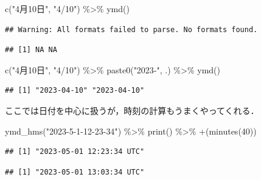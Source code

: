 \documentclass[
]{article}
\newenvironment{Shaded}{\begin{snugshade}}{\end{snugshade}}
\newcommand{\AttributeTok}[1]{\textcolor[rgb]{0.77,0.63,0.00}{#1}}
\newcommand{\DecValTok}[1]{\textcolor[rgb]{0.00,0.00,0.81}{#1}}
\newcommand{\FunctionTok}[1]{\textcolor[rgb]{0.00,0.00,0.00}{#1}}
\newcommand{\NormalTok}[1]{#1}
\newcommand{\SpecialCharTok}[1]{\textcolor[rgb]{0.00,0.00,0.00}{#1}}
\newcommand{\StringTok}[1]{\textcolor[rgb]{0.31,0.60,0.02}{#1}}
\begin{document}
\begin{Shaded}
\begin{Highlighting}[]
\FunctionTok{c}\NormalTok{(}\StringTok{"4月10日"}\NormalTok{, }\StringTok{"4/10"}\NormalTok{) }\SpecialCharTok{\%\textgreater{}\%}
  \FunctionTok{ymd}\NormalTok{()}
\end{Highlighting}
\end{Shaded}

\begin{verbatim}
## Warning: All formats failed to parse. No formats found.
\end{verbatim}

\begin{verbatim}
## [1] NA NA
\end{verbatim}

\begin{Shaded}
\begin{Highlighting}[]
\FunctionTok{c}\NormalTok{(}\StringTok{"4月10日"}\NormalTok{, }\StringTok{"4/10"}\NormalTok{) }\SpecialCharTok{\%\textgreater{}\%}
  \FunctionTok{paste0}\NormalTok{(}\StringTok{"2023{-}"}\NormalTok{, .) }\SpecialCharTok{\%\textgreater{}\%}
  \FunctionTok{ymd}\NormalTok{()}
\end{Highlighting}
\end{Shaded}

\begin{verbatim}
## [1] "2023-04-10" "2023-04-10"
\end{verbatim}

ここでは日付を中心に扱うが，時刻の計算もうまくやってくれる．

\begin{Shaded}
\begin{Highlighting}[]
\FunctionTok{ymd\_hms}\NormalTok{(}\StringTok{"2023{-}5{-}1{-}12{-}23{-}34"}\NormalTok{) }\SpecialCharTok{\%\textgreater{}\%}
  \FunctionTok{print}\NormalTok{() }\SpecialCharTok{\%\textgreater{}\%}
  \StringTok{\textasciigrave{}}\AttributeTok{+}\StringTok{\textasciigrave{}}\NormalTok{(}\FunctionTok{minutes}\NormalTok{(}\DecValTok{40}\NormalTok{))}
\end{Highlighting}
\end{Shaded}

\begin{verbatim}
## [1] "2023-05-01 12:23:34 UTC"
\end{verbatim}

\begin{verbatim}
## [1] "2023-05-01 13:03:34 UTC"
\end{verbatim}
\end{document}

